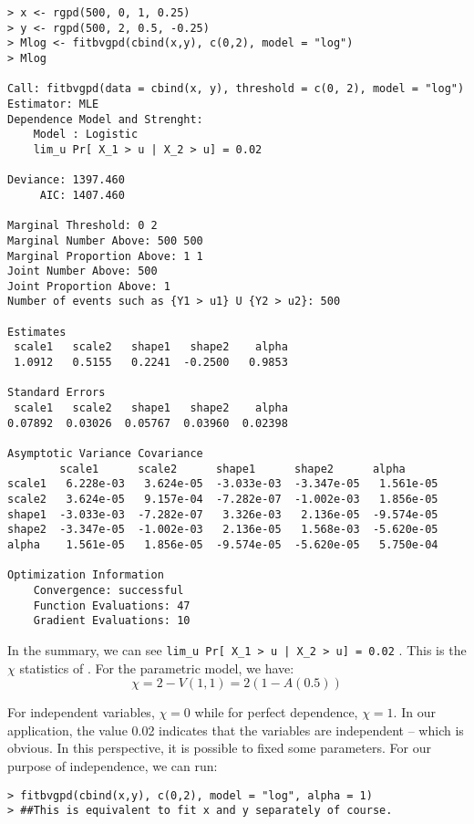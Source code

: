 \documentclass[11pt,a4paper]{article}
\numberwithin{equation}{section}
\theoremstyle{definition}
\begin{document}
\begin{verbatim}
> x <- rgpd(500, 0, 1, 0.25)
> y <- rgpd(500, 2, 0.5, -0.25)
> Mlog <- fitbvgpd(cbind(x,y), c(0,2), model = "log")
> Mlog

Call: fitbvgpd(data = cbind(x, y), threshold = c(0, 2), model = "log") 
Estimator: MLE 
Dependence Model and Strenght:
	Model : Logistic 
	lim_u Pr[ X_1 > u | X_2 > u] = 0.02

Deviance: 1397.460 
     AIC: 1407.460 

Marginal Threshold: 0 2 
Marginal Number Above: 500 500 
Marginal Proportion Above: 1 1 
Joint Number Above: 500 
Joint Proportion Above: 1 
Number of events such as {Y1 > u1} U {Y2 > u2}: 500 

Estimates
 scale1   scale2   shape1   shape2    alpha  
 1.0912   0.5155   0.2241  -0.2500   0.9853  

Standard Errors
 scale1   scale2   shape1   shape2    alpha  
0.07892  0.03026  0.05767  0.03960  0.02398  

Asymptotic Variance Covariance
        scale1      scale2      shape1      shape2      alpha     
scale1   6.228e-03   3.624e-05  -3.033e-03  -3.347e-05   1.561e-05
scale2   3.624e-05   9.157e-04  -7.282e-07  -1.002e-03   1.856e-05
shape1  -3.033e-03  -7.282e-07   3.326e-03   2.136e-05  -9.574e-05
shape2  -3.347e-05  -1.002e-03   2.136e-05   1.568e-03  -5.620e-05
alpha    1.561e-05   1.856e-05  -9.574e-05  -5.620e-05   5.750e-04

Optimization Information
	Convergence: successful 
	Function Evaluations: 47 
	Gradient Evaluations: 10
\end{verbatim}

In the summary, we can see \verb+lim_u Pr[ X_1 > u | X_2 > u] = 0.02+
. This is the $\chi$ statistics of \citet{Coles1999}. For the
parametric model, we have:
\begin{displaymath}
  \chi = 2 - V(1,1) = 2 \left(1 - A(0.5) \right)
\end{displaymath}

For independent variables, $\chi = 0$ while for perfect dependence,
$\chi = 1$. In our application, the value 0.02 indicates that the
variables are independent -- which is obvious. In this perspective, it
is possible to fixed some parameters. For our purpose of independence,
we can run:
\begin{verbatim}
> fitbvgpd(cbind(x,y), c(0,2), model = "log", alpha = 1)
> ##This is equivalent to fit x and y separately of course.
\end{verbatim}
\end{document}
